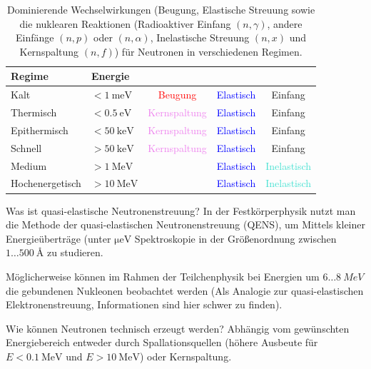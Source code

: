 \begin{table}[H]
    \centering
    \begin{tabular}{|ll|ccc|}
        \hline
        Regime & Energie & & & \\
        \hline
        Kalt & $< \SI{1}{\milli\electronvolt}$ & \textcolor{red}{Beugung} & \textcolor{blue}{Elastisch} & \textcolor{Dandelion}{Einfang} \\
        Thermisch & $< \SI{0.5}{\electronvolt}$ & \textcolor{violet}{Kernspaltung} & \textcolor{blue}{Elastisch} & \textcolor{Dandelion}{Einfang} \\
        Epithermisch & $< \SI{50}{\kilo\electronvolt}$ & \textcolor{violet}{Kernspaltung} & \textcolor{blue}{Elastisch} & \textcolor{Dandelion}{Einfang} \\
        Schnell & $> \SI{50}{\kilo\electronvolt}$ & \textcolor{violet}{Kernspaltung} & \textcolor{blue}{Elastisch} & \textcolor{Dandelion}{Einfang} \\
        Medium & $> \SI{1}{\mega\electronvolt}$ &   & \textcolor{blue}{Elastisch} & \textcolor{Turquoise}{Inelastisch} \\
        Hochenergetisch & $> \SI{10}{\mega\electronvolt}$ &   & \textcolor{blue}{Elastisch} & \textcolor{Turquoise}{Inelastisch} \\
        \hline
    \end{tabular}
    \caption{Dominierende Wechselwirkungen (Beugung, Elastische Streuung sowie die nuklearen Reaktionen (Radioaktiver Einfang $(n, \gamma)$, andere Einfänge $(n, p)$ oder $(n, \alpha)$, Inelastische Streuung $(n, x)$ und Kernspaltung $(n, f)$) für Neutronen in verschiedenen Regimen.}
\end{table}

\begin{fquestion}{Was ist quasi-elastische Neutronenstreuung?}
    In der Festkörperphysik nutzt man die Methode der quasi-elastischen Neutronenstreuung (QENS), um Mittels kleiner Energieüberträge (unter $\si{\micro\electronvolt}$ Spektroskopie in der Größenordnung zwischen $1\ldots\SI{500}{\angstrom}$ zu studieren.
    
    Möglicherweise können im Rahmen der Teilchenphysik bei Energien um $6\ldots\SI{8}{MeV}$ die gebundenen Nukleonen beobachtet werden (Als Analogie zur quasi-elastischen Elektronenstreuung, Informationen sind hier schwer zu finden).
\end{fquestion}

\begin{fquestion}{Wie können Neutronen technisch erzeugt werden?}
    Abhängig vom gewünschten Energiebereich entweder durch Spallationsquellen (höhere Ausbeute für $E < \SI{0.1}{\mega\electronvolt}$ und $E>\SI{10}{\mega\electronvolt}$) oder Kernspaltung.
\end{fquestion}


